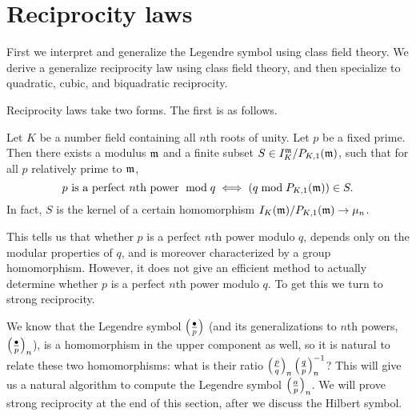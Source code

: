 \section{Reciprocity laws}
First we interpret and generalize the Legendre symbol using class field theory. We derive a generalize reciprocity law using class field theory, and then specialize to quadratic, cubic, and biquadratic reciprocity.

Reciprocity laws take two forms. The first is as follows.
\begin{thm}
Let $K$ be a number field containing all $n$th roots of unity. Let $p$ be a fixed prime. Then there exists a modulus $\mathfrak{m}$ and a finite subset $S\in I_K^{\mathfrak{m}}/P_{K,1}(\mathfrak{m})$, such that for all $p$ relatively prime to $\mathfrak{m}$, 
\[
p\text{ is a perfect }n\text{th power }\bmod q\iff
(q\bmod{P_{K,1}(\mathfrak{m})}) \in S.
\]
In fact, $S$ is the kernel of a certain homomorphism $I_K(\mathfrak{m})/P_{K,1}(\mathfrak{m})\to \mu_n$.
\end{thm}
This tells us that whether $p$ is a perfect $n$th power modulo $q$, depends only on the modular properties of $q$, and is moreover characterized by a group homomorphism. However, it does not give an efficient method to actually determine whether $p$ is a perfect $n$th power modulo $q$. To get this we turn to strong reciprocity.

We know that the Legendre symbol $\left( {\frac{\bullet}{p}} \right)$ (and its generalizations to $n$th powers, $\left( {\frac{\bullet}{p}} \right)_n$), is a homomorphism in the upper component as well, so it is natural to relate these two homomorphisms: what is their ratio $\left( {\frac{p}{q}} \right)_n\left( {\frac{q}{p}} \right)_n^{-1}$? This will give us a natural algorithm to compute the Legendre symbol $\left( {\frac{a}{p}} \right)_n$. We will prove strong reciprocity at the end of this section, after we discuss the Hilbert symbol.

